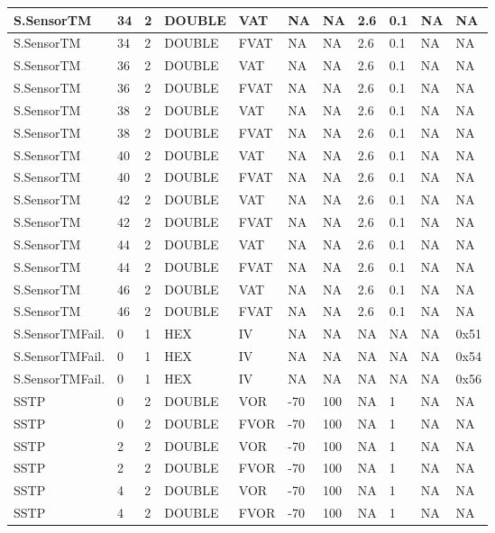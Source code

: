 {\begin{longtable}{|l|l|l|l|l|l|l|l|l|l|l|}
S.SensorTM & 34 & 2 & DOUBLE & VAT & NA & NA & 2.6 & 0.1 & NA & NA \\ \hline
S.SensorTM & 34 & 2 & DOUBLE & FVAT & NA & NA & 2.6 & 0.1 & NA & NA \\ \hline
S.SensorTM & 36 & 2 & DOUBLE & VAT & NA & NA & 2.6 & 0.1 & NA & NA \\ \hline
S.SensorTM & 36 & 2 & DOUBLE & FVAT & NA & NA & 2.6 & 0.1 & NA & NA \\ \hline
S.SensorTM & 38 & 2 & DOUBLE & VAT & NA & NA & 2.6 & 0.1 & NA & NA \\ \hline
S.SensorTM & 38 & 2 & DOUBLE & FVAT & NA & NA & 2.6 & 0.1 & NA & NA \\ \hline
S.SensorTM & 40 & 2 & DOUBLE & VAT & NA & NA & 2.6 & 0.1 & NA & NA \\ \hline
S.SensorTM & 40 & 2 & DOUBLE & FVAT & NA & NA & 2.6 & 0.1 & NA & NA \\ \hline
S.SensorTM & 42 & 2 & DOUBLE & VAT & NA & NA & 2.6 & 0.1 & NA & NA \\ \hline
S.SensorTM & 42 & 2 & DOUBLE & FVAT & NA & NA & 2.6 & 0.1 & NA & NA \\ \hline
S.SensorTM & 44 & 2 & DOUBLE & VAT & NA & NA & 2.6 & 0.1 & NA & NA \\ \hline
S.SensorTM & 44 & 2 & DOUBLE & FVAT & NA & NA & 2.6 & 0.1 & NA & NA \\ \hline
S.SensorTM & 46 & 2 & DOUBLE & VAT & NA & NA & 2.6 & 0.1 & NA & NA \\ \hline
S.SensorTM & 46 & 2 & DOUBLE & FVAT & NA & NA & 2.6 & 0.1 & NA & NA \\ \hline
S.SensorTMFail. & 0 & 1 & HEX & IV & NA & NA & NA & NA & NA & 0x51 \\ \hline
S.SensorTMFail. & 0 & 1 & HEX & IV & NA & NA & NA & NA & NA & 0x54 \\ \hline
S.SensorTMFail. & 0 & 1 & HEX & IV & NA & NA & NA & NA & NA & 0x56 \\ \hline
SSTP & 0 & 2 & DOUBLE & VOR & -70 & 100 & NA & 1 & NA & NA \\ \hline
SSTP & 0 & 2 & DOUBLE & FVOR & -70 & 100 & NA & 1 & NA & NA \\ \hline
SSTP & 2 & 2 & DOUBLE & VOR & -70 & 100 & NA & 1 & NA & NA \\ \hline
SSTP & 2 & 2 & DOUBLE & FVOR & -70 & 100 & NA & 1 & NA & NA \\ \hline
SSTP & 4 & 2 & DOUBLE & VOR & -70 & 100 & NA & 1 & NA & NA \\ \hline
SSTP & 4 & 2 & DOUBLE & FVOR & -70 & 100 & NA & 1 & NA & NA \\ \hline

\end{longtable}}
